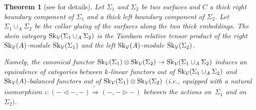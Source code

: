 \documentclass[pdftex]{sigma}%
\numberwithin{equation}{section}
\newtheorem{Theorem}{Theorem}[section]
\begin{document}
\begin{Theorem}[see {\cite[Theorem~1.22]{Cooke}} for details]\label{thExcSkCat}
Let $\Sigma_1$ and $\Sigma_2$ be two surfaces and $C$ a thick right boundary component of $\Sigma_1$ and a thick left boundary component of $\Sigma_2$. Let $\Sigma_1\cup_{A}\Sigma_2$ be the collar gluing of the surfaces along the two thick embeddings. The skein category ${\rm Sk}_\mathcal{V}(\Sigma_1\cup_{A} \Sigma_2)$ is the Tambara relative tensor product of the right ${\rm Sk}_\mathcal{V}({A})$-module ${\rm Sk}_\mathcal{V}(\Sigma_1)$ and the left ${\rm Sk}_\mathcal{V}({A})$-module ${\rm Sk}_\mathcal{V}(\Sigma_2)$.

Namely, the canonical functor ${\rm Sk}_\mathcal{V}(\Sigma_1) \otimes {\rm Sk}_\mathcal{V}(\Sigma_2) \to {\rm Sk}_\mathcal{V}(\Sigma_1\cup_{A} \Sigma_2)$ induces an equivalence of categories between $k$-linear functors out of ${\rm Sk}_\mathcal{V}(\Sigma_1\cup_{A} \Sigma_2)$ and ${\rm Sk}_\mathcal{V}({A})$-balanced functors out of ${\rm Sk}_\mathcal{V}(\Sigma_1) \otimes {\rm Sk}_\mathcal{V}(\Sigma_2)$ $($i.e., equipped with a natural isomorphism $\iota\colon (-\lhd-,-)\tilde{\Rightarrow}(-,-\rhd-)$ between the actions on~$\Sigma_1$ and on $\Sigma_2)$.
\end{Theorem}
\end{document}
